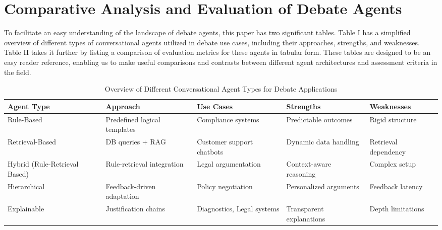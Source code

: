 \documentclass[conference]{IEEEtran}
\begin{document}
\section{Comparative Analysis and Evaluation of Debate Agents}
To facilitate an easy understanding of the landscape of debate agents, this paper has two significant tables. Table I has a simplified overview of different types of conversational agents utilized in debate use cases, including their approaches, strengths, and weaknesses. Table II takes it further by listing a comparison of evaluation metrics for these agents in tabular form. These tables are designed to be an easy reader reference, enabling us to make useful comparisons and contrasts between different agent architectures and assessment criteria in the field.
\begin{table}[ht]
    \centering
    \caption{Overview of Different Conversational Agent Types for Debate Applications}
    \label{tab:agents}
    \begin{tabular}{|>{\centering\arraybackslash}p{1.2cm}|>{\centering\arraybackslash}p{1.5cm}|>{\centering\arraybackslash}p{1.6cm}|>{\centering\arraybackslash}p{1.3cm}|>{\centering\arraybackslash}p{1.3cm}|}
    \hline
    \textbf{Agent Type}   & \textbf{Approach}                    & \textbf{Use Cases}                   & \textbf{Strengths}         & \textbf{Weaknesses}        \\ \hline
    Rule-Based           & Predefined logical templates                  & Compliance systems \cite{montealto2021rulebased}        & Predictable outcomes       & Rigid structure            \\ \hline
    Retrieval-Based      & DB queries + RAG                      & Customer support chatbots \cite{rakshit2019debbie}  & Dynamic data handling      & Retrieval dependency       \\ \hline
    Hybrid (Rule-Retrieval Based)               & Rule-retrieval integration            & Legal argumentation \cite{kulatska2019arguebot}        & Context-aware reasoning    & Complex setup              \\ \hline
    Hierarchical         & Feedback-driven adaptation \cite{sakai2020hierarchical}  & Policy negotiation                   & Personalized arguments     & Feedback latency           \\ \hline
    Explainable          & Justification chains \cite{ali2022supportattack}       & Diagnostics, Legal systems           & Transparent explanations   & Depth limitations          \\ \hline
    \end{tabular}
\end{table}
\end{document}
